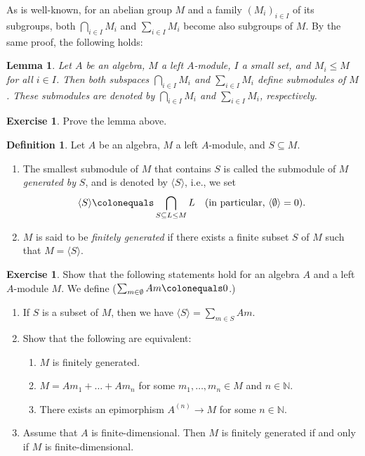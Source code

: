 \documentclass{surv-l}
\numberwithin{equation}{chapter}
\numberwithin{figure}{chapter}
\theoremstyle{plain}
\newtheorem{lem}[thm]{Lemma}
\theoremstyle{definition}
\newtheorem{dfn}[thm]{Definition}
\newtheorem{exc}[thm]{Exercise}
\theoremstyle{remark}
\begin{document}
As is well-known, for an abelian group $M$ and a family $(M_i)_{i \in I}$
of its subgroups, both
$\bigcap_{i \in I} M_i$ and $\sum_{i \in I} M_i$ become also
subgroups of $M$.
By the same proof, the following holds:

\begin{lem}\label{lem:intersection-sum}
Let $A$ be an algebra, $M$ a left $A$-module,
$I$ a small set, and $M_i \le M$ for all $i \in I$.
Then both subspaces $\bigcap_{i \in I} M_i$ and
$\sum_{i \in I} M_i$ define submodules of $M$.
These submodules are denoted by
$\bigcap_{i\in I} M_i$ and $\sum_{i\in I} M_i$, respectively.
\end{lem}

\begin{exc}
Prove the lemma above.
\end{exc}

\begin{dfn}
Let $A$ be an algebra, $M$ a left $A$-module, and
$S \subseteq M$.
\begin{enumerate}
\item
The smallest submodule of $M$ that contains $S$ is called
the submodule of $M$ \emph{generated by} $S$, and is denoted by ${\langle S \rangle}$, i.e.,
we set
\[
{\langle S \rangle}\colonequals  \bigcap_{S \subseteq L \le M} L
\quad (\text{in particular, } {\langle\emptyset \rangle} = 0).
\]
\item
$M$ is said to be \emph{finitely generated}
if there exists a finite subset $S$ of $M$ such that $M = {\langle S \rangle}$.
\end{enumerate}
\end{dfn}

\begin{exc}
Show that the following statements hold for an algebra $A$ and a left
$A$-module $M$. We define 
($\sum_{m \in \emptyset} Am\colonequals  0$.)
\begin{enumerate}
\item
If $S$ is a subset of $M$, then we have
${\langle S \rangle} = \sum_{m \in S} Am$.
\item
Show that the following are equivalent:
\begin{enumerate}
\item
$M$ is finitely generated.
\item
$M = Am_1 +\dots + Am_n$ for some $m_1,\dots, m_n \in M$
and $n \in \mathbb{N}$.
\item
There exists an epimorphism $A^{(n)} \to M$
for some $n \in \mathbb{N}$.
\end{enumerate}
\item
Assume that $A$ is finite-dimensional.
Then $M$ is finitely generated if and only if $M$ is finite-dimensional.
\end{enumerate}
\end{exc}
\end{document}
